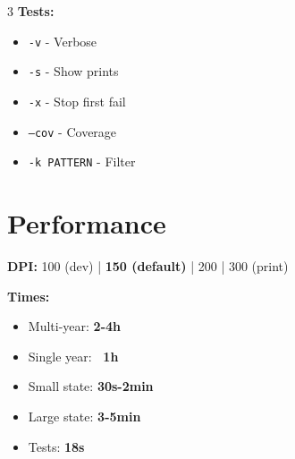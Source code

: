 \documentclass[10pt,landscape]{article}
\begin{document}
\begin{multicols}{3}
\textbf{Tests:}
\begin{itemize}\itemsep0pt
\item \texttt{-v} - Verbose
\item \texttt{-s} - Show prints
\item \texttt{-x} - Stop first fail
\item \texttt{--cov} - Coverage
\item \texttt{-k PATTERN} - Filter
\end{itemize}

\section*{Performance}

\textbf{DPI:} 100 (dev) | \textbf{150 (default)} | 200 | 300 (print)

\textbf{Times:}
\begin{itemize}\itemsep0pt
\item Multi-year: \textbf{2-4h}
\item Single year: \textbf{~1h}
\item Small state: \textbf{30s-2min}
\item Large state: \textbf{3-5min}
\item Tests: \textbf{18s}
\end{itemize}

\end{multicols}
\end{document}
